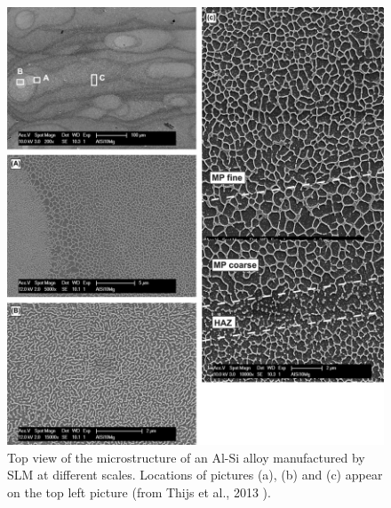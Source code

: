 \begin{figure}[ht]
	\centering
	\includegraphics[scale=0.40]{Images/micro_am}
	\decoRule
	\caption[Top view of the microstructure of an Al-Si alloy manufactured by SLM at different scales. Locations of pictures (a), (b) and (c) appear on the top left picture]{Top view of the microstructure of an Al-Si alloy manufactured by SLM at different scales. Locations of pictures (a), (b) and (c) appear on the top left picture (from Thijs et al., 2013 \parencite{Thijs13}).}
	\label{fig:micro_am}
\end{figure}

